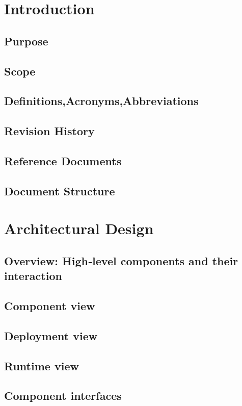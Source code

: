 \documentclass[a4paper]{report}
\begin{document}
\tableofcontents
\listoffigures
\begingroup
\let\clearpage\relax %
\listoftables
\endgroup
\restoregeometry

\chapter{Introduction}
\section{Purpose}
\section{Scope}
\section{Definitions,Acronyms,Abbreviations}
\section{Revision History}
\section{Reference Documents}
\section{Document Structure}

\chapter{Architectural Design}
\section{Overview: High­‐level components and their	interaction}
\section{Component view}
\section{Deployment view}
\section{Runtime view}
\section{Component interfaces}
\end{document}
